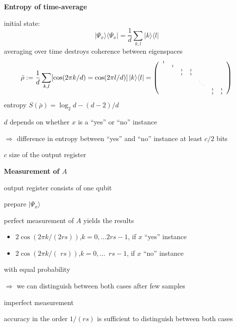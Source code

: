 \documentclass[portrait]{seminar}
\newcommand{\ket}[1]{|#1\rangle}
\newcommand{\bra}[1]{\langle #1|}
\begin{document}
\begin{slide}
{\large {\bf Entropy of time-average}}

initial state:
\[
\ket{\Psi_x}\bra{\Psi_x}=\frac{1}{d}
\sum_{k,l} \ket{k}\bra{l}
\]
averaging over time destroys coherence between eigenspaces
\[
\bar{\rho}:=\frac{1}{d}\sum_{k,l}
[\cos(2\pi k/d)=\cos(2\pi l/d)]\, \ket{k}\bra{l}=
{\tiny \left(
\begin{array}{ccccccc}
1 &   &   &   &        &   &   \\
  & 1 &   &   &        &   &   \\
  &   & 1 & 1 &        &   &   \\
  &   & 1 & 1 &        &   &   \\
  &   &   &   & \ddots &   &   \\
  &   &   &   &        & 1 & 1 \\
  &   &   &   &        & 1 & 1 \\
\end{array}
\right)}
\]
\quad\quad entropy $S(\bar{\rho})=\log_2 d - (d-2)/d$

\vspace{0.25cm}
$d$ depends on whether $x$ is a ``yes'' or ``no'' instance

{\red $\Longrightarrow$ difference in entropy between ``yes'' and
``no'' instance at least $c/2$ bits}

\quad\quad $c$ size of the output register
\end{slide}

\begin{slide}
{\large {\bf Measurement of $A$}}

output register consists of one qubit

\vspace{0.25cm}
prepare $\ket{\Psi_x}$

perfect measurement of $A$ yields the results
\begin{itemize}
\item $2\cos(2\pi k / (2 r s))$,\quad $k=0,\ldots 2 rs -1$, if $x$
``yes'' instance
\item $2\cos(2\pi k / (\,\,r s))$,\quad $k=0,\ldots \,\,\, rs -1$, if $x$
``no'' instance
\end{itemize}
with equal probability

{\red $\Longrightarrow$ we can distinguish between both cases after few
samples}

\vspace{0.25cm}
imperfect measurement

{\red accuracy in the order $1/(rs)$ is sufficient to distinguish between
both cases}
\end{slide}
\end{document}
